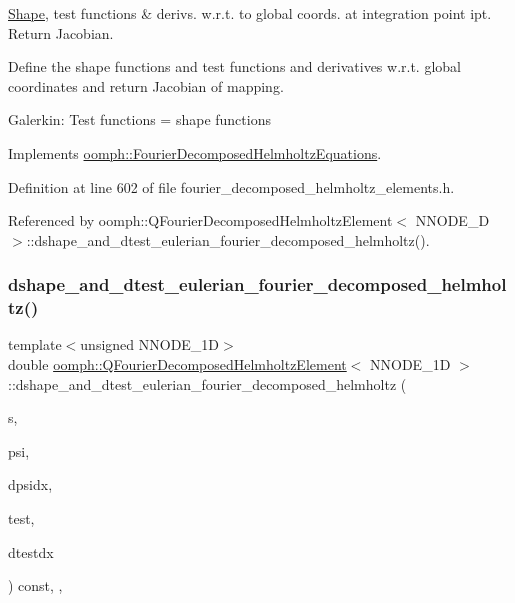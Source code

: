\hyperlink{classoomph_1_1Shape}{Shape}, test functions \& derivs. w.\+r.\+t. to global coords. at integration point ipt. Return Jacobian. 

Define the shape functions and test functions and derivatives w.\+r.\+t. global coordinates and return Jacobian of mapping.

Galerkin\+: Test functions = shape functions 

Implements \hyperlink{classoomph_1_1FourierDecomposedHelmholtzEquations_aa19bdb12fe50805a9ad1f75912c85678}{oomph\+::\+Fourier\+Decomposed\+Helmholtz\+Equations}.



Definition at line 602 of file fourier\+\_\+decomposed\+\_\+helmholtz\+\_\+elements.\+h.



Referenced by oomph\+::\+Q\+Fourier\+Decomposed\+Helmholtz\+Element$<$ N\+N\+O\+D\+E\+\_\+D $>$\+::dshape\+\_\+and\+\_\+dtest\+\_\+eulerian\+\_\+fourier\+\_\+decomposed\+\_\+helmholtz().

\mbox{\label{classoomph_1_1QFourierDecomposedHelmholtzElement_aa1d0a5bb5a90ffa76df0bb054ffb00db}} 
\subsubsection{\texorpdfstring{dshape\+\_\+and\+\_\+dtest\+\_\+eulerian\+\_\+fourier\+\_\+decomposed\+\_\+helmholtz()}{dshape\_and\_dtest\_eulerian\_fourier\_decomposed\_helmholtz()}}
{\footnotesize\ttfamily template$<$unsigned N\+N\+O\+D\+E\+\_\+1D$>$ \\
double \hyperlink{classoomph_1_1QFourierDecomposedHelmholtzElement}{oomph\+::\+Q\+Fourier\+Decomposed\+Helmholtz\+Element}$<$ N\+N\+O\+D\+E\+\_\+1D $>$\+::dshape\+\_\+and\+\_\+dtest\+\_\+eulerian\+\_\+fourier\+\_\+decomposed\+\_\+helmholtz (\begin{DoxyParamCaption}\item[{const \hyperlink{classoomph_1_1Vector}{Vector}$<$ double $>$ \&}]{s,  }\item[{\hyperlink{classoomph_1_1Shape}{Shape} \&}]{psi,  }\item[{\hyperlink{classoomph_1_1DShape}{D\+Shape} \&}]{dpsidx,  }\item[{\hyperlink{classoomph_1_1Shape}{Shape} \&}]{test,  }\item[{\hyperlink{classoomph_1_1DShape}{D\+Shape} \&}]{dtestdx }\end{DoxyParamCaption}) const\hspace{0.3cm}{\ttfamily [inline]}, {\ttfamily [protected]}, {\ttfamily [virtual]}}

